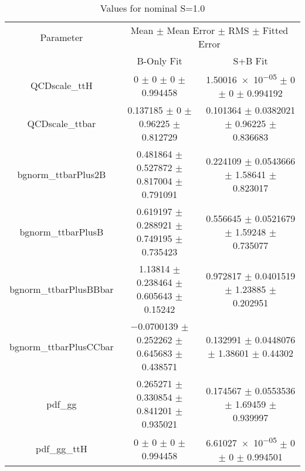 \begin{table}
\centering
\caption{Values for nominal S=1.0}
\begin{tabular}{ccc}
\toprule
Parameter & \multicolumn{2}{c}{Mean $\pm$ Mean Error $\pm$ RMS $\pm$ Fitted Error}\\
 & B-Only Fit & S+B Fit\\
\midrule
QCDscale\_ttH & \num{0} $\pm$ \num{0} $\pm$ \num{0} $\pm$ \num{0.994458} & \num{1.50016e-05} $\pm$ \num{0} $\pm$ \num{0} $\pm$ \num{0.994192}\\
QCDscale\_ttbar & \num{0.137185} $\pm$ \num{0} $\pm$ \num{0.96225} $\pm$ \num{0.812729} & \num{0.101364} $\pm$ \num{0.0382021} $\pm$ \num{0.96225} $\pm$ \num{0.836683}\\
bgnorm\_ttbarPlus2B & \num{0.481864} $\pm$ \num{0.527872} $\pm$ \num{0.817004} $\pm$ \num{0.791091} & \num{0.224109} $\pm$ \num{0.0543666} $\pm$ \num{1.58641} $\pm$ \num{0.823017}\\
bgnorm\_ttbarPlusB & \num{0.619197} $\pm$ \num{0.288921} $\pm$ \num{0.749195} $\pm$ \num{0.735423} & \num{0.556645} $\pm$ \num{0.0521679} $\pm$ \num{1.59248} $\pm$ \num{0.735077}\\
bgnorm\_ttbarPlusBBbar & \num{1.13814} $\pm$ \num{0.238464} $\pm$ \num{0.605643} $\pm$ \num{0.15242} & \num{0.972817} $\pm$ \num{0.0401519} $\pm$ \num{1.23885} $\pm$ \num{0.202951}\\
bgnorm\_ttbarPlusCCbar & \num{-0.0700139} $\pm$ \num{0.252262} $\pm$ \num{0.645683} $\pm$ \num{0.438571} & \num{0.132991} $\pm$ \num{0.0448076} $\pm$ \num{1.38601} $\pm$ \num{0.44302}\\
pdf\_gg & \num{0.265271} $\pm$ \num{0.330854} $\pm$ \num{0.841201} $\pm$ \num{0.935021} & \num{0.174567} $\pm$ \num{0.0553536} $\pm$ \num{1.69459} $\pm$ \num{0.939997}\\
pdf\_gg\_ttH & \num{0} $\pm$ \num{0} $\pm$ \num{0} $\pm$ \num{0.994458} & \num{6.61027e-05} $\pm$ \num{0} $\pm$ \num{0} $\pm$ \num{0.994501}\\
\bottomrule
\end{tabular}
\end{table}
